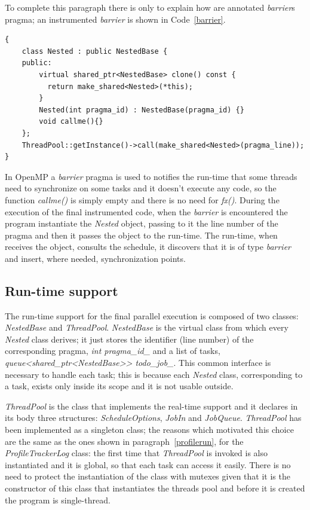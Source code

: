 \documentclass[a4paper,11pt,oneside]{book}
\begin{document}
To complete this paragraph there is only to explain how are annotated \emph{barrier}s pragma; an instrumented \emph{barrier} is shown in Code~\ref{barrier}.

\begin{lstlisting}[language=CCC, caption=Example of \emph{barrier} instrumentation., label=barrier]
{
    class Nested : public NestedBase {
    public:
        virtual shared_ptr<NestedBase> clone() const { 
          return make_shared<Nested>(*this); 
        } 
        Nested(int pragma_id) : NestedBase(pragma_id) {}
        void callme(){}
    };
    ThreadPool::getInstance()->call(make_shared<Nested>(pragma_line));
}
\end{lstlisting}


In OpenMP a \emph{barrier} pragma is used to notifies the run-time that some threads need to synchronize on some tasks and it doesn’t execute any code, so the function \emph{callme()} is simply empty and there is no need for \emph{fx()}. During the execution of the final instrumented code, when the \emph{barrier} is encountered the program instantiate the \emph{Nested} object, passing to it the line number of the pragma and then it passes the object to the run-time. The run-time, when receives the object, consults the schedule, it discovers that it is of type \emph{barrier} and insert, where needed, synchronization points. 

\subsection{Run-time support}
The run-time support for the final parallel execution is composed of two classes: \emph{NestedBase} and \emph{ThreadPool}. \emph{NestedBase} is the virtual class from which every \emph{Nested} class derives; it just stores the identifier (line number) of the corresponding pragma, \emph{ int pragma\_id\_} and a list of tasks, \emph{queue<shared\_ptr<NestedBase>> todo\_job\_}. This common interface is necessary to handle each task; this is because each \emph{Nested} class, corresponding to a task, exists only inside its scope and it is not usable outside.   

\emph{ThreadPool} is the class that implements the real-time support and it declares in its body three structures: \emph{ScheduleOptions}, \emph{JobIn} and \emph{JobQueue}. \emph{ThreadPool} has been implemented as a singleton class; the reasons which motivated this choice are the same as the ones shown in paragraph~\ref{profilerun}, for the \emph{ProfileTrackerLog} class: the first time that \emph{ThreadPool} is invoked is also instantiated and it is global, so that each task can access it easily. There is no need to protect the instantiation of the class with mutexes given that it is the constructor of this class that instantiates the threads pool and before it is created the program is single-thread. 
\end{document}
